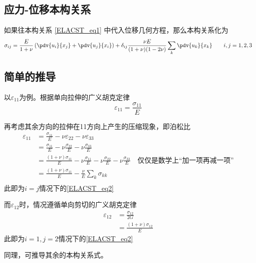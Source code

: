 \subsection{应力-位移本构关系}
如果往本构关系 \autoref{ELACST_eq1} 中代入位移几何方程，那么本构关系化为
\begin{equation}
\sigma_{ij}=\frac{E}{1+\nu}\left(\pdv{u_i}{x_j}+\pdv{u_j}{x_i}\right)
+\delta_{ij}\frac{\nu E}{(1+\nu)(1-2\nu)}\sum_k\pdv{u_k}{x_k}\qquad i,j=1,2,3
\end{equation}

\subsection{简单的推导}
以$\varepsilon_{11}$为例。根据单向拉伸的广义胡克定律
$$\varepsilon_{11} = \frac{\sigma_{11}}{E}$$

再考虑其余方向的拉伸在11方向上产生的压缩现象，即泊松比
$$
\begin{aligned}
\varepsilon_{11} &= \frac{\sigma_{11}}{E} - \nu \varepsilon_{22}  - \nu \varepsilon_{33}\\
&=\frac{\sigma_{11}}{E} - \nu\frac{\sigma_{22}}{E} - \nu\frac{\sigma_{33}}{E}\\
&=\frac{(1+\nu)\sigma_{11}}{E} - \nu\frac{\sigma_{11}}{E}  - \nu\frac{\sigma_{22}}{E} - \nu\frac{\sigma_{33}}{E} \quad \text{仅仅是数学上“加一项再减一项”}\\
&=\frac{(1+\nu)\sigma_{11}}{E} - \frac{\nu}{E}\sum_k \sigma_{kk} \\
\end{aligned}
$$
此即为$i=j$情况下的\autoref{ELACST_eq2} 

而$\varepsilon_{12}$时，情况遵循单向剪切的广义胡克定律
$$
\begin{aligned}
\varepsilon_{12} &= \frac{\sigma_{12}}{2G}\\
&=\frac{(1+\nu)\sigma_{12}}{E}
\end{aligned}
$$
此即为$i=1, j=2$情况下的\autoref{ELACST_eq2} 

同理，可推导其余的本构关系式。
